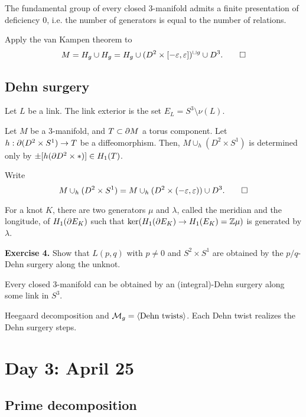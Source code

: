 \documentclass{../../small}
\begin{document}
\begin{cor}
The fundamental group of every closed 3-manifold admits a finite presentation of deficiency 0, i.e. the number of generators is equal to the number of relations.
\end{cor}
\begin{pf}
Apply the van Kampen theorem to
\[M=H_g\cup H_g=H_g\cup(D^2\times[-\varepsilon,\varepsilon])^{\sqcup g}\cup D^3.\qedhere\]
\end{pf}

\subsection{Dehn surgery}
Let $L$ be a link.
The link exterior is the set $E_L=S^3\setminus\nu(L)$.

\begin{prop}
Let $M$ be a 3-manifold, and $T\subset\pd M$ a torus component.
Let $h:\pd(D^2\times S^1)\to T$ be a diffeomorphism.
Then, $M\cup_h(D^2\times S^1)$ is determined only by $\pm[h(\pd D^2\times*)]\in H_1(T)$.
\end{prop}
\begin{pf}
Write
\[M\cup_h(D^2\times S^1)=M\cup_h(D^2\times(-\varepsilon,\varepsilon))\cup D^3.\qedhere\]
\end{pf}
For a knot $K$, there are two generators $\mu$ and $\lambda$, called the meridian and the longitude, of $H_1(\pd E_K)$ such that $\ker(H_1(\pd E_K)\to H_1(E_K)=\Z\mu)$ is generated by $\lambda$.

\textbf{Exercise 4.} Show that $L(p,q)$ with $p\ne0$ and $S^2\times S^1$ are obtained by the $p/q$-Dehn surgery along the unknot.

\begin{thm}
Every closed 3-manifold can be obtained by an (integral)-Dehn surgery along some link in $S^3$.
\end{thm}
\begin{pf}[Sketch]
Heegaard decomposition and $\mathcal{M}_g=\langle\text{Dehn twists}\rangle$.
Each Dehn twist realizes the Dehn surgery steps.
\end{pf}

\newpage
\section{Day 3: April 25}
\subsection*{Prime decomposition}
\end{document}
